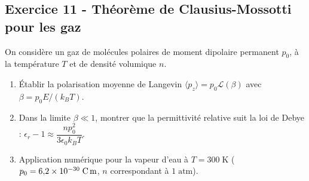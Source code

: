 \documentclass[12pt,a4paper]{article}
\begin{document}
\subsection*{Exercice 11 - Théorème de Clausius-Mossotti pour les gaz \niveau{\moyen}}

\begin{boiteexercice}
On considère un gaz de molécules polaires de moment dipolaire permanent $p_0$, à la température $T$ et de densité volumique $n$.
\begin{enumerate}
  \item Établir la polarisation moyenne de Langevin $\langle p_z\rangle = p_0\mathcal{L}(\beta)$ avec $\beta = p_0 E/(k_B T)$.
  \item Dans la limite $\beta\ll 1$, montrer que la permittivité relative suit la loi de Debye : $\epsilon_r - 1 \approx \dfrac{n p_0^2}{3\epsilon_0 k_B T}$.
  \item Application numérique pour la vapeur d'eau à $T=300\;\text{K}$ ($p_0 = 6{,}2\times 10^{-30}\;\text{C\,m}$, $n$ correspondant à $1\;\text{atm}$).
\end{enumerate}
\end{boiteexercice}
\end{document}

